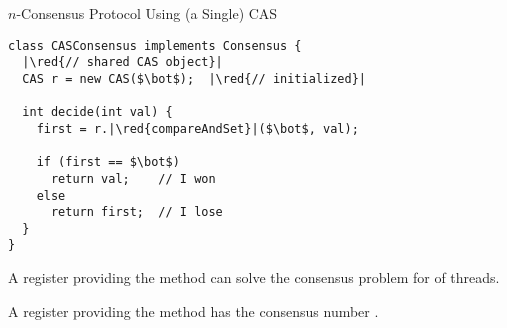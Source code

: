 \begin{frame}{}
  \centerline{\LARGE $n$-Consensus Protocol Using {\normalsize (a Single)} \textsf{CAS}}

\end{frame}

\begin{frame}[fragile]{}
  \begin{lstlisting}[style = CStyle]
class CASConsensus implements Consensus {
  |\red{// shared CAS object}|
  CAS r = new CAS($\bot$);  |\red{// initialized}|

  int decide(int val) {
    first = r.|\red{compareAndSet}|($\bot$, val);

    if (first == $\bot$)
      return val;    // I won
    else
      return first;  // I lose
  }
}
  \end{lstlisting}
\end{frame}
% 
\begin{frame}{}
  \begin{theorem}
    A  register providing the  method
    can solve the consensus problem for  of threads.
  \end{theorem}

  \pause
  \vspace{0.60cm}
  \begin{theorem}
    A  register providing the  method
    has the consensus number \blue{$\infty$}.
  \end{theorem}
\end{frame}

